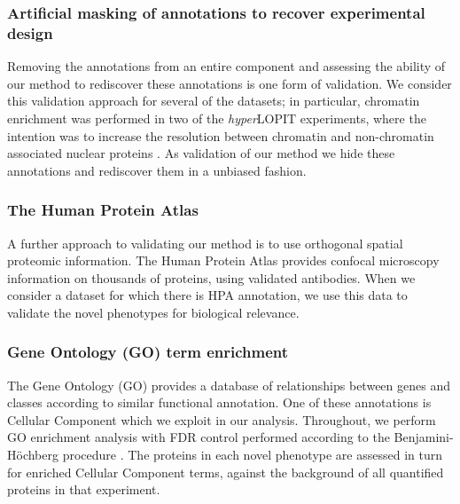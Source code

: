 \documentclass[12pt,english]{article}
\begin{document}
\subsubsection{Artificial masking of annotations to recover experimental design}
Removing the annotations from an entire component and assessing the ability of our method to rediscover these annotations is one form of validation. We consider this validation approach for several of the datasets; in particular, chromatin enrichment was performed in two of the \textit{hyper}LOPIT experiments, where the intention was to increase the resolution between chromatin and non-chromatin associated nuclear proteins \citep{hyper, Mulvey:2017, DC:2018}. As validation of our method we hide these annotations and rediscover them in a unbiased fashion.
\subsubsection{The Human Protein Atlas}
A further approach to validating our method is to use orthogonal spatial proteomic information. The Human Protein Atlas \citep{Thul:2017, Sullivan:2018} provides confocal microscopy information on thousands of proteins, using validated antibodies. When we consider a dataset for which there is HPA annotation, we use this data to validate the novel phenotypes for biological relevance. 
\subsubsection{Gene Ontology (GO) term enrichment}
The Gene Ontology (GO) provides a database of relationships between genes and classes according to similar functional annotation. One of these annotations is Cellular Component which we exploit in our analysis. Throughout, we perform GO enrichment analysis with FDR control performed according to the Benjamini-H\"ochberg procedure \citep{FDR:1995,Ashburner:2000,Yu:2012}. The proteins in each novel phenotype are assessed in turn for enriched Cellular Component terms, against the background of all quantified proteins in that experiment. 
\end{document}
